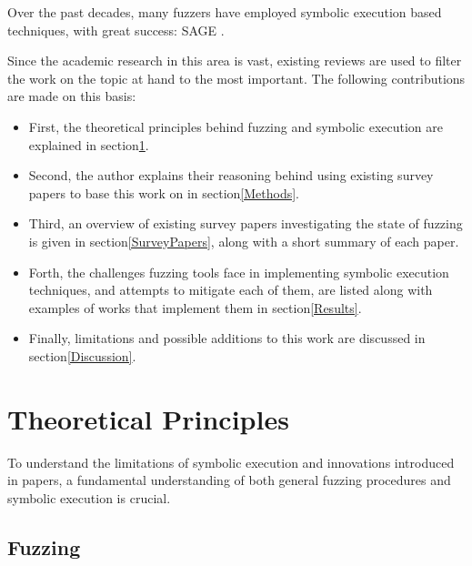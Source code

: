 \documentclass{article}
\begin{document}
\begin{multicols}{2}
    Over the past decades, many fuzzers\cite{BitBlaze,CORAL,CREST,CUTE,CVC5,CVCLite,Chopped,Cyberdyne,DART,DTSA,DiSE,DigFuzz,Dowser,Driller,EGT,EXE,Fitnex,FloPSy,GRT,GSE,HCT,HFL,IFL,Intriguer,JFI,KATCH,KLEE,KLEEFP,LATEST,MoWF,Moles,PYGMALION,Pangolin,Pex,QSYM,QuickFuzz,RWset,SAGE,SAVIOR,SMART,SPIN,STP,ScalableAutomatedMethods,TFuzz,TaintScope,VUzzer} have employed symbolic execution based techniques, with great success: SAGE\cite{SAGE} \cite{FuzzingTheStateOfTheArt}.

    Since the academic research in this area is vast, existing reviews are used to filter the work on the topic at hand to the most important. The following contributions are made on this basis:
    \begin{itemize}
        \item First, the theoretical principles behind fuzzing and symbolic execution are explained in section\ref{Theory}.
        \item Second, the author explains their reasoning behind using existing survey papers to base this work on in section\ref{Methods}.
        \item Third, an overview of existing survey papers investigating the state of fuzzing is given in section\ref{SurveyPapers}, along with a short summary of each paper.
        \item Forth, the challenges fuzzing tools face in implementing symbolic execution techniques, and attempts to mitigate each of them, are listed along with examples of works that implement them in section\ref{Results}.
        \item Finally, limitations and possible additions to this work are discussed in section\ref{Discussion}.
    \end{itemize}

    \section{Theoretical Principles}
    \label{Theory}

    To understand the limitations of symbolic execution and innovations introduced in papers, a fundamental understanding of both general fuzzing procedures and symbolic execution is crucial.

    \subsection{Fuzzing}


\end{multicols}
\end{document}
